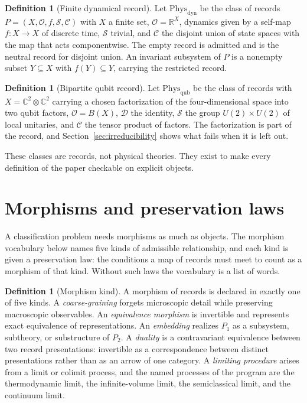 \documentclass[11pt,letterpaper]{article}
\theoremstyle{definition}
\newtheorem{definition}[theorem]{Definition}
\theoremstyle{remark}
\begin{document}
\begin{definition}[Finite dynamical record]
\label{def:finite-dynamical}
Let $\mathrm{Phys}_{\mathrm{dyn}}$ be the class of records $P = (X, \mathcal{O}, f, \mathcal{S}, \mathcal{C})$ with $X$ a finite set, $\mathcal{O} = \mathbb{R}^{X}$, dynamics given by a self-map $f \colon X \to X$ of discrete time, $\mathcal{S}$ trivial, and $\mathcal{C}$ the disjoint union of state spaces with the map that acts componentwise. The empty record is admitted and is the neutral record for disjoint union. An invariant subsystem of $P$ is a nonempty subset $Y \subseteq X$ with $f(Y) \subseteq Y$, carrying the restricted record.
\end{definition}

\begin{definition}[Bipartite qubit record]
\label{def:qubit}
Let $\mathrm{Phys}_{\mathrm{qub}}$ be the class of records with $X = \mathbb{C}^2 \otimes \mathbb{C}^2$ carrying a chosen factorization of the four-dimensional space into two qubit factors, $\mathcal{O} = B(X)$, $\mathcal{D}$ the identity, $\mathcal{S}$ the group $U(2) \times U(2)$ of local unitaries, and $\mathcal{C}$ the tensor product of factors. The factorization is part of the record, and Section~\ref{sec:irreducibility} shows what fails when it is left out.
\end{definition}

These classes are records, not physical theories. They exist to make every definition of the paper checkable on explicit objects.

\section{Morphisms and preservation laws}
\label{sec:morphisms}

A classification problem needs morphisms as much as objects. The morphism vocabulary below names five kinds of admissible relationship, and each kind is given a preservation law: the conditions a map of records must meet to count as a morphism of that kind. Without such laws the vocabulary is a list of words.

\begin{definition}[Morphism kind]
\label{def:morphism-kind}
A morphism of records is declared in exactly one of five kinds. A \emph{coarse-graining} forgets microscopic detail while preserving macroscopic observables. An \emph{equivalence morphism} is invertible and represents exact equivalence of representations. An \emph{embedding} realizes $P_1$ as a subsystem, subtheory, or substructure of $P_2$. A \emph{duality} is a contravariant equivalence between two record presentations: invertible as a correspondence between distinct presentations rather than as an arrow of one category. A \emph{limiting procedure} arises from a limit or colimit process, and the named processes of the program are the thermodynamic limit, the infinite-volume limit, the semiclassical limit, and the continuum limit.
\end{definition}
\end{document}
